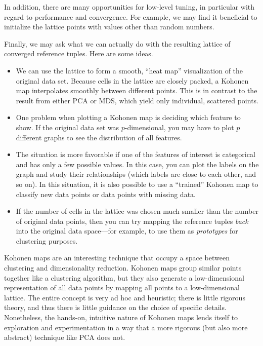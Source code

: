 In addition, there are many opportunities for low-level tuning, in
particular with regard to performance and convergence. For example, we
may find it beneficial to initialize the lattice points with values
other than random numbers.

Finally, we may ask what we can actually do with the resulting lattice
of converged reference tuples. Here are some ideas.

\begin{itemize}
\item We can use the lattice to form a smooth, ``heat map''
  visualization of the original data set. Because cells in the lattice
  are closely packed, a Kohonen map interpolates smoothly between
  different points. This is in contrast to the result from either PCA
  or MDS, which yield only individual, scattered points.
\item One problem when plotting a Kohonen map is deciding which
  feature to show. If the original data set was $p$-dimensional,
  you may have to plot $p$ different graphs to see the distribution
  of all features.
\item The situation is more favorable if one of the features of
  interest is categorical and has only a few possible values. In this
  case, you can plot the labels on the graph and study their
  relationships (which labels are close to each other, and so on). In
  this situation, it is also possible to use a ``trained'' Kohonen map
  to classify new data points or data points with missing data.
\item If the number of cells in the lattice was chosen much smaller
  than the number of original data points, then you can try mapping
  the reference tuples \emph{back} into the original data space---for
  example, to use them as \emph{prototypes} for clustering purposes.
\end{itemize}

Kohonen maps are an interesting technique that occupy a space
between clustering and dimensionality reduction. Kohonen maps group
similar points together like a clustering algorithm, but they also
generate a low-dimensional representation of all data points by
mapping all points to a low-dimensional lattice. The entire concept is
very ad hoc and heuristic; there is little rigorous theory, and thus
there is little guidance on the choice of specific details.
Nonetheless, the hands-on, intuitive nature of Kohonen maps lends
itself to exploration and experimentation in a way that a more
rigorous (but also more abstract) technique like PCA does not.

